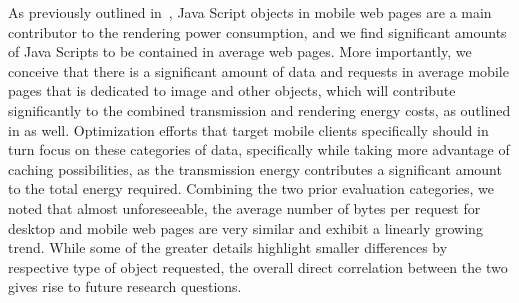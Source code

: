 \documentclass[onecolumn,12pt]{IEEEtran}
\begin{document}
%
%
As previously outlined in~\cite{ThAgNiBoSi12}, Java Script objects in mobile web pages are a main contributor to the rendering power consumption, and we find significant amounts of Java Scripts to be contained in average web pages.
More importantly, we conceive that there is a significant amount of data and requests in average mobile pages that is dedicated to image and other objects, which will contribute significantly to the combined transmission and rendering energy costs, as outlined in \cite{ThAgNiBoSi12} as well.
Optimization efforts that target mobile clients specifically should in turn focus on these categories of data, specifically while taking more advantage of caching possibilities, as the transmission energy contributes a significant amount to the total energy required.
%
%
Combining the two prior evaluation categories, we noted that almost unforeseeable, the average number of bytes per request for desktop and mobile web pages are very similar and exhibit a linearly growing trend.
While some of the greater details highlight smaller differences by respective type of object requested, the overall direct correlation between the two gives rise to future research questions.
%
%
\end{document}

